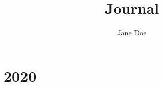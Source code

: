 \documentclass[nobib,a4paper]{tufte-book}
\title{Journal} %
\author[Jane Doe]{Jane Doe} %
\begin{document}
\frontmatter


\maketitle





\tableofcontents %



\mainmatter

\chapter{2020} %





\backmatter


\end{document}
